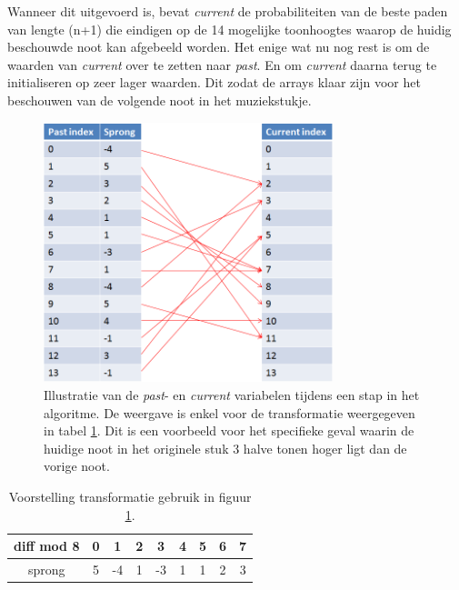 Wanneer dit uitgevoerd is, bevat \textit{current} de probabiliteiten van de beste paden van lengte (n+1) die eindigen op de 14 mogelijke toonhoogtes waarop de huidig beschouwde noot kan afgebeeld worden.
Het enige wat nu nog rest is om de waarden van \textit{current} over te zetten naar \textit{past}. En om \textit{current} daarna terug te initialiseren op zeer lager waarden. Dit zodat de arrays klaar zijn voor het beschouwen van de volgende noot in het muziekstukje. 

\begin{figure}[!ht]
  \centering
  \includegraphics[width=0.75\textwidth]{4_Efficient_Toepassen_Transformatie/stap_algo_1}
  \caption{Illustratie van de \textit{past}- en \textit{current} variabelen tijdens een stap in het algoritme. De weergave is enkel voor de transformatie weergegeven in tabel \ref{tabel:transformatie}. Dit is een voorbeeld voor het specifieke geval waarin de huidige noot in het originele stuk 3 halve tonen hoger ligt dan de vorige noot.}
  \label{figuur:stap_algo_1}
\end{figure}

\begin{table}
  \centering
  \begin{tabular}{c | c  c  c  c  c  c  c  c }
    diff mod 8 & 0 & 1 & 2 & 3 & 4 & 5 & 6 & 7 \\
    \hline
    sprong & 5 & -4 & 1 & -3 & 1 & 1 & 2 & 3 \\
  \end{tabular}
  \caption{Voorstelling transformatie gebruik in figuur \ref{figuur:stap_algo_1}.}
  \label{tabel:transformatie}
\end{table}

